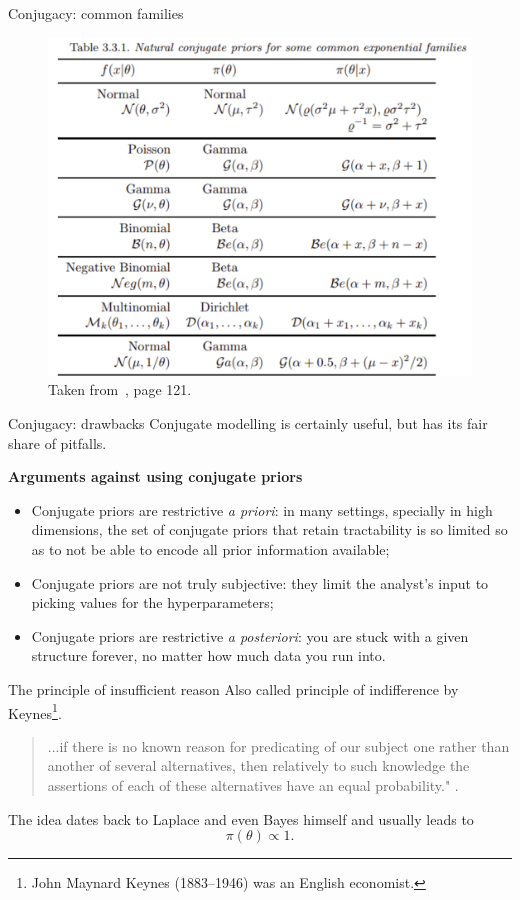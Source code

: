 \begin{frame}{Conjugacy: common families}
\begin{figure}
 \includegraphics[scale=.5]{figures/conjugate_table.pdf}
 \caption{Taken from~\cite{Robert2007}, page 121.}
\end{figure}
\end{frame}
\begin{frame}{Conjugacy: drawbacks}
Conjugate modelling is certainly useful, but has its fair share of pitfalls.

\textbf{Arguments against using conjugate priors}
\begin{itemize}
 \item Conjugate priors are restrictive \textit{a priori}: in many settings, specially in high dimensions, the set of conjugate priors that retain tractability is so limited so as to not be able to encode all prior information available;
 \item Conjugate priors are not truly subjective: they limit the analyst's input to picking values for the hyperparameters;
  \item Conjugate priors are restrictive \textit{a posteriori}: you are stuck with a given structure forever, no matter how much data you run into.
\end{itemize}
\end{frame}
\begin{frame}{The principle of insufficient reason}
 Also called principle of indifference by Keynes\footnote{John Maynard Keynes (1883--1946) was an English economist.}.
 \begin{quote}
  ...if there is no known reason for predicating of our subject one rather than another of several alternatives, then relatively to such knowledge the assertions of each of these alternatives have an equal probability." \cite[Ch4 pg. 52-53]{Keynes1921}. 
 \end{quote}
 The idea dates back to Laplace and even Bayes himself and usually leads to 
$$ \pi(\theta) \propto 1.$$
 \end{frame}
